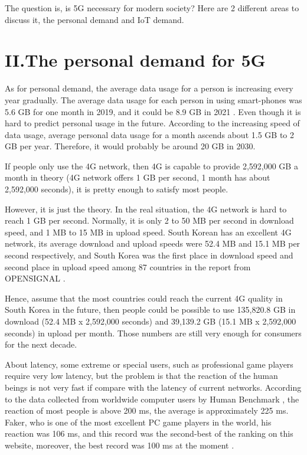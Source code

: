 \documentclass[conference]{IEEEtran}
\begin{document}
The question is, is 5G necessary for modern society? Here are 2 different areas to discuss it, the personal demand and IoT demand.

\section{II.The personal demand for 5G}

As for personal demand, the average data usage for a person is increasing every year gradually. The average data usage for each person in using smart-phones was 5.6 GB for one month in 2019, and it could be 8.9 GB in 2021 \cite{4} . Even though it is hard to predict personal usage in the future. According to the increasing speed of data usage, average personal data usage for a month ascends about 1.5 GB to 2 GB per year. Therefore, it would probably be around 20 GB in 2030. 

If people only use the 4G network, then 4G is capable to provide 2,592,000 GB a month in theory (4G network offers 1 GB per second, 1 month has about 2,592,000 seconds), it is pretty enough to satisfy most people.

However, it is just the theory. In the real situation, the 4G network is hard to reach 1 GB per second. Normally, it is only 2 to 50 MB per second in download speed, and 1 MB to 15 MB in upload speed. South Korean has an excellent 4G network, its average download and upload speeds were 52.4 MB and 15.1 MB per second respectively, and South Korea was the first place in download speed and second place in upload speed among 87 countries in the report from OPENSIGNAL \cite{5}.

Hence, assume that the most countries could reach the current 4G quality in South Korea in the future, then people could be possible to use 135,820.8 GB in download (52.4 MB x 2,592,000 seconds) and 39,139.2 GB (15.1 MB x 2,592,000 seconds) in upload per month. Those numbers are still very enough for consumers for the next decade.

About latency, some extreme or special users, such as professional game players require very low latency, but the problem is that the reaction of the human beings is not very fast if compare with the latency of current networks. According to the data collected from worldwide computer users by Human Benchmark \cite{6}, the reaction of most people is above 200 ms, the average is approximately 225 ms. Faker, who is one of the most excellent PC game players in the world, his reaction was 106 ms, and this record was the second-best of the ranking on this website, moreover, the best record was 100 ms at the moment \cite{7}.
\end{document}
